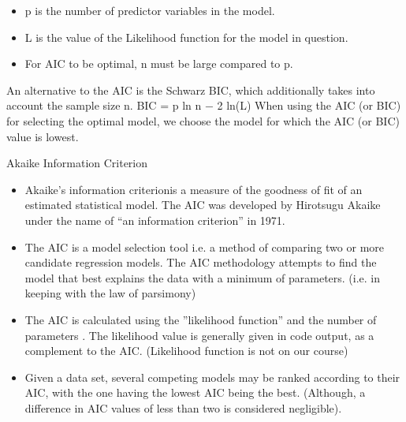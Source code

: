 \documentclass[a4paper,12pt]{article}
\begin{document}
\begin{itemize}
\item p is the number of predictor variables in the model.
\item L is the value of the Likelihood function for the model in question.
\item For AIC to be optimal, n must be large compared to p.
\end{itemize}

An alternative to the AIC is the Schwarz BIC, which additionally takes into account the
sample size n.
BIC = p ln n − 2 ln(L)
When using the AIC (or BIC) for selecting the optimal model, we choose the model for which
the AIC (or BIC) value is lowest.


Akaike Information Criterion

\begin{itemize}
\item Akaike’s information criterionis a measure of the goodness of fit of an estimated statistical
model. The AIC was developed by Hirotsugu Akaike under the name of “an information
criterion” in 1971.
\item The AIC is a model selection tool i.e. a method of comparing two or more candidate
regression models. The AIC methodology attempts to find the model that best explains
the data with a minimum of parameters. (i.e. in keeping with the law of parsimony)
\item The AIC is calculated using the ”likelihood function” and the number of parameters .
The likelihood value is generally given in code output, as a complement to the AIC.
(Likelihood function is not on our course)
\item Given a data set, several competing models may be ranked according to their AIC, with
the one having the lowest AIC being the best. (Although, a difference in AIC values of
less than two is considered negligible).

\end{itemize}

\end{document}
